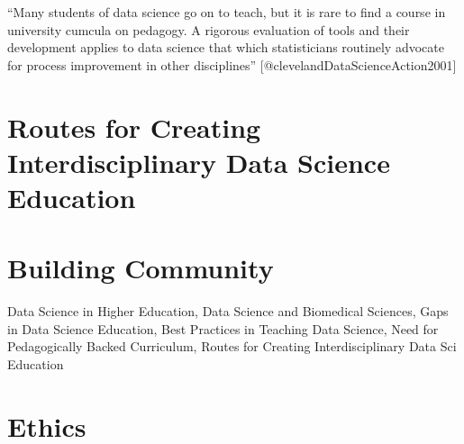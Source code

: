 \documentclass[../main.tex]{subfiles}
\begin{document}
    ``Many students of data science
    go on to teach, but it is rare to find a course in university cumcula on pedagogy.
    A
    rigorous evaluation
    of tools and their development applies to data science that which statisticians routinely advocate for
    process improvement in other disciplines'' [@clevelandDataScienceAction2001]

    \section{Routes for Creating Interdisciplinary Data Science Education}

    \section{Building Community}

    Data Science in Higher Education,
    Data Science and Biomedical Sciences,
    Gaps in Data Science Education,
    Best Practices in Teaching Data Science,
    Need for Pedagogically Backed Curriculum,
    Routes for Creating Interdisciplinary Data Sci Education

    \section{Ethics}
\end{document}
